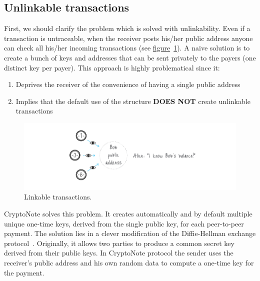 \subsection{Unlinkable transactions}
First, we should clarify the problem which is solved with unlinkability. Even if a transaction is untraceable, when the receiver posts his/her public address anyone can check all his/her incoming transactions (see \hyperref[fig:linkable]{figure}~\ref{fig:linkable}). A naive solution is to create a bunch of keys and addresses that can be sent privately to the payers (one distinct key per payer). This approach is highly problematical since it:
\begin{enumerate}[label=\alph*)]
  \item Deprives the receiver of the convenience of having a single public address
  \item Implies that the default use of the structure \textbf{DOES NOT} create unlinkable transactions
\end{enumerate}
\begin{figure}[H]
  \centering
  \includegraphics[width=0.9 \columnwidth,keepaspectratio]{Images/CryptoNote/linkable.png}
  \caption{Linkable transactions.~\cite{cryptonote}}
  \label{fig:linkable}
\end{figure}
\vspace{0.15cm}

CryptoNote solves this problem. It creates automatically and by default multiple unique one-time keys, derived from the single public key, for each peer-to-peer payment. The solution lies in a clever modification of the Diffie-Hellman exchange protocol~\cite{Diffie:2006:NDC:2263321.2269104}. Originally, it allows two parties to produce a common secret key derived from their public keys. In CryptoNote protocol the sender uses the receiver's public address and his own random data to compute a one-time key for the payment.

